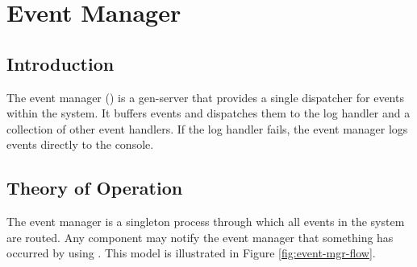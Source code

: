 %
%
%

\chapter {Event Manager}\label{chap:event-mgr}

\section {Introduction}

The event manager () is a gen-server that provides a
single dispatcher for events within the system. It buffers events and
dispatches them to the log handler and a collection of other event
handlers. If the log handler fails, the event manager logs events
directly to the console.

\section {Theory of Operation}

The event manager is a singleton process through which all events in
the system are routed. Any component may notify the event manager that
something has occurred by using . This model
is illustrated in Figure \ref{fig:event-mgr-flow}.

